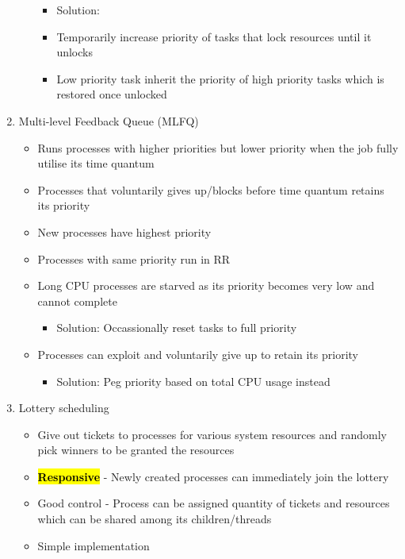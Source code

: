 \documentclass[10pt]{article}
\newcommand{\keyword}[2][]{\sethlcolor{highlight}\hl{\textbf{#2}} #1 - }
\begin{document}
\begin{multicols*}{3}
\begin{enumerate}
\begin{itemize}
		\begin{itemize}
			\item Solution:
			\item Temporarily increase priority of tasks that lock resources until it unlocks
			\item Low priority task inherit the priority of high priority tasks which is restored once unlocked
		\end{itemize}
	\end{itemize}
	\item Multi-level Feedback Queue (MLFQ)
	\begin{itemize}
		\item Runs processes with higher priorities but lower priority when the job fully utilise its time quantum
		\item Processes that voluntarily gives up/blocks before time quantum retains its priority
		\item New processes have highest priority
		\item Processes with same priority run in RR
		\item Long CPU processes are starved as its priority becomes very low and cannot complete
		\begin{itemize}
			\item Solution: Occassionally reset tasks to full priority 
		\end{itemize}
		\item Processes can exploit and voluntarily give up to retain its priority
		\begin{itemize}
			\item Solution: Peg priority based on total CPU usage instead 
		\end{itemize}
	\end{itemize}
	\item Lottery scheduling
	\begin{itemize}
		\item Give out tickets to processes for various system resources and randomly pick winners to be granted the resources
		\item \keyword{Responsive}{Newly created processes can immediately join the lottery}
		\item Good control - Process can be assigned quantity of tickets and resources which can be shared among its children/threads
		\item Simple implementation
	\end{itemize}
\end{enumerate}

\end{multicols*}
\end{document}
